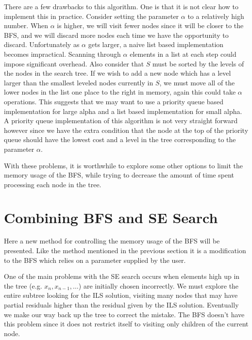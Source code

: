 \documentclass[12pt,Bold,letterpaper]{mcgilletdclass}
\newcommand{\vsp}{\vspace{\baselineskip}}
\begin{document}
There are a few drawbacks to this algorithm. One is that it is not clear how to implement this in practice. Consider setting the parameter $\alpha$ to a relatively high number. When $\alpha$ is higher, we will visit fewer nodes since it will be closer to the BFS, and we will discard more nodes each time we have the opportunity to discard. Unfortunately as $\alpha$ gets larger, a naive list based implementation becomes impractical. Scanning through $\alpha$ elements in a list at each step could impose significant overhead. Also consider that $S$ must be sorted by the levels of the nodes in the search tree. If we wish to add a new node which has a level larger than the smallest leveled nodes currently in $S$, we must move all of the lower nodes in the list one place to the right in memory, again this could take $\alpha$ operations. This suggests that we may want to use a priority queue based implementation for large alpha and a list based implementation for small alpha. A priority queue implementation of this algorithm is not very straight forward however since we have the extra condition that the node at the top of the priority queue should have the lowest cost and a level in the tree corresponding to the parameter $\alpha$. 

With these problems, it is worthwhile to explore some other options to limit the memory usage of the BFS, while trying to decrease the amount of time spent processing each node in the tree.

\vsp \section{Combining BFS and SE Search}

Here a new method for controlling the memory usage of the BFS will be presented. Like the method mentioned in the previous section \cite{StuBF07} it is a modification to the BFS which relies on a parameter supplied by the user.

One of the main problems with the SE search occurs when elements high up in the tree (e.g. $x_n, x_{n-1} , \dots$) are initially chosen incorrectly. We must explore the entire subtree looking for the ILS solution, visiting many nodes that may have partial residuals higher than the residual given by the ILS solution. Eventually we make our way back up the tree to correct the mistake. The BFS doesn't have this problem since it does not restrict itself to visiting only children of the current node.
\end{document}
